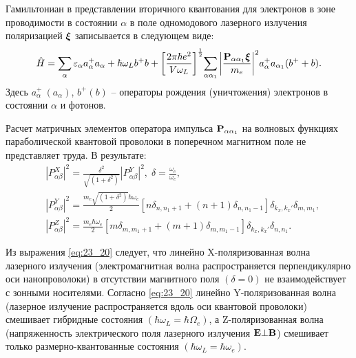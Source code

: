 Гамильтониан в представлении вторичного квантования для электронов в зоне проводимости в состоянии $\alpha $ в поле одномодового лазерного излучения поляризацией $\boldsymbol{\mathbf{\xi}}$ записывается в следующем виде:
\begin{equation} \label{eq:23_10} 
\hat{H}=\sum_{\alpha } {\varepsilon_{\alpha } a^+_{\alpha } a_{\alpha }} + \hbar \omega_L b^+ b + {\left[\frac{2\pi \hbar e^2} {V \omega_L} \right]}^{\frac{1}{2}} {\sum_{\alpha \alpha_1}{\left|\frac{\boldsymbol{\mathbf{P}}_{\alpha \alpha_1} \boldsymbol{\mathbf{\xi}}}{m_e}\right|}}^2 a^+_{\alpha } a_{\alpha_1} (b^+ + b).
\end{equation}
Здесь $a^+_{\alpha }\ (a_{\alpha })$, $b^+ (b)$ -- операторы рождения (уничтожения) электронов в состоянии $\alpha $ и фотонов.

Расчет матричных элементов оператора импульса $\boldsymbol{\mathbf{P}}_{\alpha\alpha_1}$ на волновых функциях параболической квантовой проволоки в поперечном магнитном поле \cite{Hashimzade2005} не представляет труда. В результате:
\begin{equation} \label{eq:23_20}
\begin{aligned}
&{\left| P^X_{\alpha \beta }\right|}^2=\frac{\delta^2}{\sqrt{\left(1+\delta^2\right)} }{\left|P^Y_{\alpha \beta }\right|}^2, \;
\delta =\frac{\omega_c}{\omega_e},\\
&\left| P^Y_{\alpha \beta }\right|^2=
\frac{m_e \sqrt{\left({1+\delta }^2\right)} \hbar\omega_e}{2} \left[  n \delta_{n,n_1+1} + (n+1) \delta_{n,n_1-1} \right]\delta_{k_x,k_x'}\delta_{m,m_1} , \\
&{\left| P^Z_{\alpha \beta }\right|}^2=\frac{m_e \hbar\omega_e}{2} \left[ m \delta_{m,m_1+1} + (m+1){\delta }_{m,m_1-1} \right]  \delta_{k_x,k_x'} \delta_{n,n_1}.
\end{aligned}
\end{equation}

Из выражения \eqref{eq:23_20} следует, что линейно X-поляризованная волна лазерного излучения (электромагнитная волна распространяется перпендикулярно оси нанопроволоки) в отсутствии магнитного поля $(\delta =0)$ не взаимодействует с зонными носителями. Согласно \eqref{eq:23_20} линейно Y-поляризованная волна (лазерное излучение распространяется вдоль оси квантовой проволоки) смешивает гибридные состояния $\left( \hbar\omega_L = \hbar\Omega_e \right) $, а Z-поляризованная волна (напряженность электрического поля лазерного излучения $\boldsymbol{\mathbf{E}}\bot \boldsymbol{\mathbf{B}}$) смешивает только размерно-квантованные состояния $ \left( \hbar\omega_L = \hbar\omega_e \right) $.

